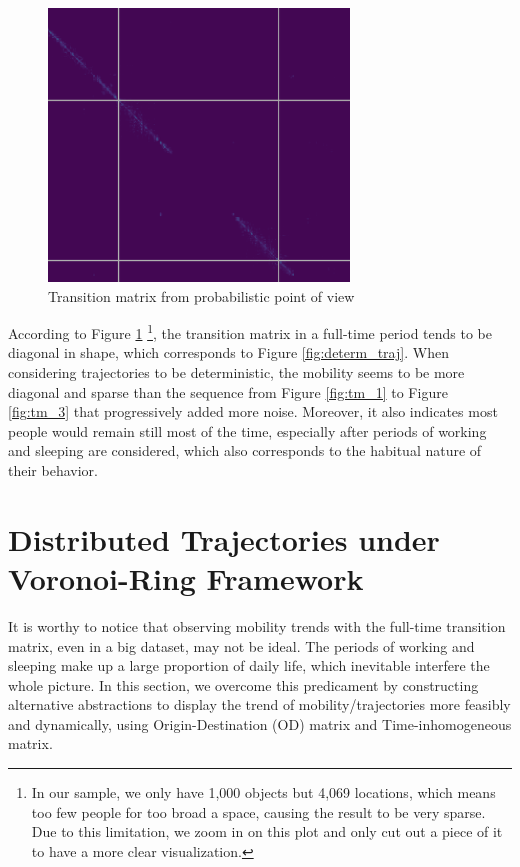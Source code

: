 \documentclass[12pt]{article}
\theoremstyle{definition}
\begin{document}
\begin{figure}
  \centering
  \includegraphics[width=8cm]{TM_1_probs.png}
  \caption{Transition matrix from probabilistic point of view}
  \label{fig:tm_prob}
\end{figure}
\newpage


According to Figure \ref{fig:tm_prob} \footnote{In our sample, we only have 1,000 objects but 4,069 locations, which means too few people for too broad a space, causing the result to be very sparse. Due to this limitation, we zoom in on this plot and only cut out a piece of it to have a more clear visualization.}, the transition matrix in a full-time period tends to be diagonal in shape, which corresponds to Figure \ref{fig:determ_traj}. When considering trajectories to be deterministic, the mobility seems to be more diagonal and sparse than the sequence from Figure \ref{fig:tm_1} to Figure \ref{fig:tm_3} that progressively added more noise. Moreover, it also indicates most people would remain still most of the time, especially after periods of working and sleeping are considered, which also corresponds to the habitual nature of their behavior.  \newpage









\section{Distributed Trajectories under Voronoi-Ring Framework}
It is worthy to notice that observing mobility trends with the full-time transition matrix, even in a big dataset, may not be ideal. The periods of working and sleeping make up a large proportion of daily life, which inevitable interfere the whole picture. In this section, we overcome this predicament by constructing alternative abstractions to display the trend of mobility/trajectories more feasibly and dynamically, using Origin-Destination (OD) matrix and Time-inhomogeneous matrix.
\end{document}
